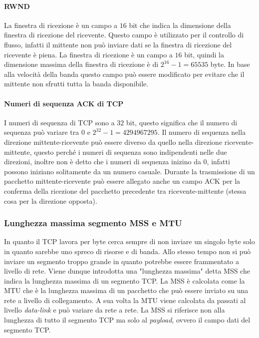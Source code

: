         \paragraph{\acrfull*{RWND}} La finestra di ricezione è un campo a $16$ bit che indica la dimensione della finestra di ricezione del ricevente. Questo campo è utilizzato per il controllo di flusso, infatti il mittente non può inviare dati se la finestra di ricezione del ricevente è piena. La finestra di ricezione è un campo a $16$ bit, quindi la dimensione massima della finestra di ricezione è di $ 2^{16} - 1 = 65535 $ byte. In base alla velocità della banda questo campo può essere modificato per evitare che il mittente non sfrutti tutta la banda disponibile.
        \paragraph{Numeri di sequenza \Acrshort*{ACK} di \Acrshort*{TCP}} I numeri di sequenza di \Acrshort*{TCP} sono a $32$ bit, questo significa che il numero di sequenza può variare tra $ 0 $ e $ 2^{32} - 1 = 4294967295 $. Il numero di sequenza nella direzione mittente-ricevente può essere diverso da quello nella direzione ricevente-mittente, questo perché i numeri di sequenza sono indipendenti nelle due direzioni, inoltre non è detto che i numeri di sequenza inizino da $ 0 $, infatti possono iniziano solitamente da un numero casuale. Durante la trasmissione di un pacchetto mittente-ricevente può essere allegato anche un campo \Acrshort*{ACK} per la conferma della ricezione del pacchetto precedente tra ricevente-mittente (stessa cosa per la direzione opposta).
        \subsubsection{Lunghezza massima segmento \Acrshort*{MSS} e \Acrshort*{MTU}}
            In quanto il \Acrshort*{TCP} lavora per byte cerca sempre di non inviare un singolo byte solo in quanto sarebbe uno spreco di risorse e di banda. Allo stesso tempo non si può inviare un segmento troppo grande in quanto potrebbe essere frammentato a livello di rete. Viene dunque introdotta una "lunghezza massima" detta \acrfull*{MSS} che indica la lunghezza massima di un segmento \Acrshort*{TCP}. La \Acrshort*{MSS} è calcolata come la \acrfull*{MTU} che è la lunghezza massima di un pacchetto che può essere inviato su una rete a livello di collegamento. A sua volta la \Acrshort*{MTU} viene calcolata da passati al livello \textit{data-link} e può variare da rete a rete. La \Acrshort*{MSS} si riferisce non alla lunghezza di tutto il segmento \Acrshort*{TCP} ma solo al \textit{payload}, ovvero il campo dati del segmento \Acrshort*{TCP}.
